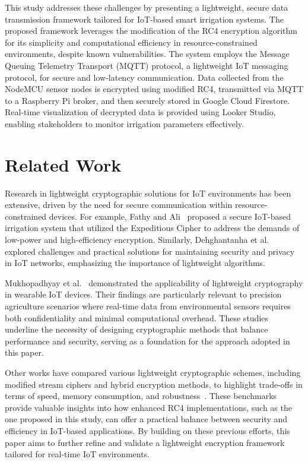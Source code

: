 \documentclass[runningheads]{llncs}
\begin{document}
This study addresses these challenges by presenting a lightweight, secure data transmission framework tailored for IoT-based smart irrigation systems. The proposed framework leverages the modification of the RC4 encryption algorithm for its simplicity and computational efficiency in resource-constrained environments, despite known vulnerabilities. The system employs the Message Queuing Telemetry Transport (MQTT) protocol, a lightweight IoT messaging protocol, for secure and low-latency communication. Data collected from the NodeMCU sensor nodes is encrypted using modified RC4, transmitted via MQTT to a Raspberry Pi broker, and then securely stored in Google Cloud Firestore. Real-time visualization of decrypted data is provided using Looker Studio, enabling stakeholders to monitor irrigation parameters effectively.

\section{Related Work}
Research in lightweight cryptographic solutions for IoT environments has been extensive, driven by the need for secure communication within resource-constrained devices. For example, Fathy and Ali~\cite{ref1} proposed a secure IoT-based irrigation system that utilized the Expeditious Cipher to address the demands of low-power and high-efficiency encryption. Similarly,
Dehghantanha et al.~\cite{ref2} explored challenges and practical solutions for maintaining security and privacy in IoT networks, emphasizing the importance of lightweight algorithms.

Mukhopadhyay et al.~\cite{ref8} demonstrated the applicability of lightweight cryptography in wearable IoT devices. Their findings are particularly relevant to precision agriculture scenarios where real-time data from environmental sensors requires both confidentiality and minimal computational overhead. These studies underline the necessity of designing cryptographic methods that balance performance and security, serving as a foundation for the approach adopted in this paper.

Other works have compared various lightweight cryptographic schemes, including modified stream ciphers and hybrid encryption methods, to highlight trade-offs in terms of speed, memory consumption, and robustness~\cite{ref3,ref4}. These benchmarks provide valuable insights into how enhanced RC4 implementations, such as the one proposed in this study, can offer a practical balance between security and efficiency in IoT-based applications. By building on these previous efforts, this paper aims to further refine and validate a lightweight encryption framework tailored for real-time IoT environments.
\end{document}
